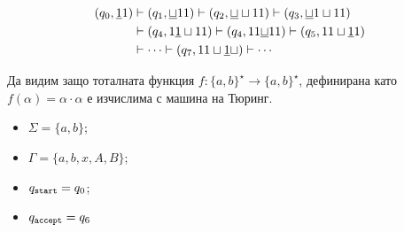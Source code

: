 \begin{example}
\begin{align*}
  (q_0, \underline{1}1) & \vdash (q_1, \underline{\sqcup}11) \vdash  (q_2, \underline{\sqcup} \sqcup 11) \vdash  (q_3, \underline{\sqcup} 1 \sqcup 11)\\
                        & \vdash (q_4, 1\underline{1}\sqcup 11) \vdash (q_4, 11 \underline{\sqcup} 11) \vdash (q_5, 11\sqcup \underline{1}1)\\
                        & \vdash \cdots \vdash (q_7, 11 \sqcup \underline{1}\sqcup) \vdash \cdots
\end{align*}

\end{example}


\begin{example}
  Да видим защо тоталната функция $f:\{a,b\}^\star \to \{a,b\}^\star$, дефинирана като
  $f(\alpha) = \alpha\cdot\alpha$ е изчислима с машина на Тюринг.
  
  \begin{itemize}
  \item
    $\Sigma = \{a,b\}$;
  \item 
    $\Gamma = \{a,b,x,A,B\}$;
  \item
    $q_{\texttt{start}} = q_0$;
  \item
    $q_{\texttt{accept}} = q_6$
  \end{itemize}
  
  \begin{framed}
  \begin{figure}[H]
    \begin{center}
\end{center}
\end{figure}
\end{framed}
\end{example}
